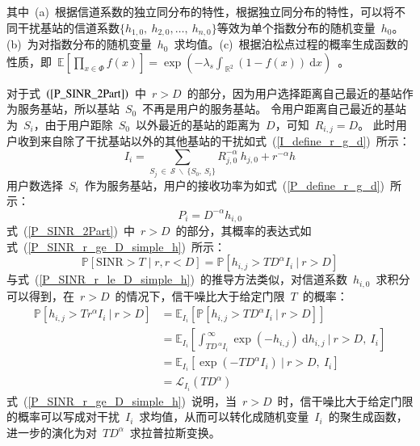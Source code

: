 其中~(a)~根据信道系数的独立同分布的特性，根据独立同分布的特性，可以将不同干扰基站的信道系数$\{h_{1,0},~h_{2,0},\dots,~h_{n,0}\}$等效为单个指数分布的随机变量~$h_0$。
(b)~为对指数分布的随机变量~$h_0$~求均值。(c)~根据泊松点过程的概率生成函数的性质，即~$\mathbb{E}\left[\prod\nolimits_{x\in\Phi}f(x)\right]=\exp(-\lambda_s\int_{~\mathbb{R}^2}(1-f(x))~\mathrm{d}x)$~。

对于式~$(\ref{P_SINR_2Part})$~中~$r > D$~的部分，因为用户选择距离自己最近的基站作为服务基站，所以基站~$S_0$~不再是用户的服务基站。
令用户距离自己最近的基站为~$S_i$，由于用户距除~$S_0$~以外最近的基站的距离为~$D$，可知~$R_{i,j}=D$。
此时用户收到来自除了干扰基站以外的其他基站的干扰如式~(\ref{I_define_r_g_d})~所示：
\begin{equation}\label{I_define_r_g_d}
I_i=\sum\limits_{ S_j\ \in\ {\mathcal{S}\ \backslash\ \{S_0,~S_i\}} }{R_{j,0}^{-\alpha} ~ h_{j,0}} + r^{-\alpha} h
\end{equation}
用户数选择~$S_i$~作为服务基站，用户的接收功率为如式~(\ref{P_define_r_g_d})~所示：
\begin{equation}\label{P_define_r_g_d}
  P_i = D^{-\alpha} h_{i,0}
\end{equation}
式~(\ref{P_SINR_2Part})~中~$r>D$~的部分，其概率的表达式如式~(\ref{P_SINR_r_ge_D_simple_h})~所示：
\begin{equation}\label{P_SINR_r_ge_D_simple_h}
  \mathbb{P}[\mathrm{SINR}>T \mid r, r < D] = \mathbb{P}\left[h_{i,j} > T D ^ \alpha I_i ~\big|~ r > D \right]
\end{equation}
与式~(\ref{P_SINR_r_le_D_simple_h})~的推导方法类似，对信道系数~$h_{i,0}$~求积分可以得到，在~$r>D$~的情况下，信干噪比大于给定门限~$T$~的概率：
\begin{equation}\label{P_SINR_r_ge_D_simple_h}
  \begin{aligned}
    \mathbb{P}\left[h_{i,j} > T r ^ \alpha I_i ~\bigg|~ r > D \right] & = \mathbb{E}_{I_i}\left[\mathbb{P}\left[h_{i,j} > T D ^ \alpha I_i ~\big|~ r > D\right]\right] \\
                                                                           & = \mathbb{E}_{I_i}\left[\int_{T D ^{\ \alpha} I_i}^{~\infty} \exp(-h_{i,j})~\mathrm{d} h_{i,j}~\bigg|~ r > D,~ I_i\right] \\
                                                                           & = \mathbb{E}_{I_i}\left[ \exp(-TD^\alpha I_i)~\big|~ r > D,~ I_i\right] \\
                                                                           & = \mathcal{L}_{I_i}(TD^\alpha)
  \end{aligned}
\end{equation}
式~(\ref{P_SINR_r_ge_D_simple_h})~说明，当~$r > D$~时，信干噪比大于给定门限的概率可以写成对干扰~$I_i$~求均值，从而可以转化成随机变量~$I_i$~的聚生成函数，
进一步的演化为对~$TD^\alpha$~求拉普拉斯变换。

